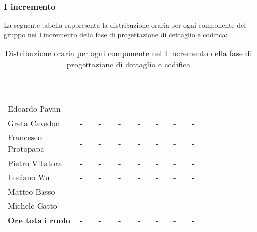 \subsubsection{I incremento}
La seguente tabella rappresenta la distribuzione oraria per ogni componente del gruppo nel I incremento della fase di progettazione di dettaglio e codifica:
\begin{table}[!htbp]
\begin{center}
\renewcommand{\arraystretch}{1.25}
\begin{tabular}{ m{}<{\centering}  m{}<{\centering} m{}<{\centering} m{}<{\centering}  m{}<{\centering}  m{}<{\centering}  m{}<{\centering}  m{}<{\centering}   }
	\rowcolor{darkblue}
	\textcolor{white}{\textbf{Componente}} &\textcolor{white}{\textbf{Re}}&\textcolor{white}{\textbf{Ad}}&\textcolor{white}{\textbf{An}}&\textcolor{white}{\textbf{Pt}}&\textcolor{white}{\textbf{Pr}}&\textcolor{white}{\textbf{Ve}}&\textcolor{white}{\textbf{Ore complessive}}\\ 

	Edoardo Pavan & - & - & - & - & - & - & -\\	

	Greta Cavedon & - & - & - & - & - & - & -\\
	
	Francesco Protopapa & - & - & - & - & - & - & -\\
	
	Pietro Villatora & - & - & - & - & - & - & -\\
	
	Luciano Wu & - & - & - & - & - & - & -\\
	
	Matteo Basso & - & - & - & - & - & - & -\\
	
	Michele Gatto & - & - & - & - & - & - & -\\
	
	\textbf{Ore totali ruolo} & - & - & - & - & - & - & -\\

\end{tabular}
\caption{Distribuzione oraria per ogni componente nel I incremento della fase di progettazione di dettaglio e codifica}
\end{center}
\end{table}

